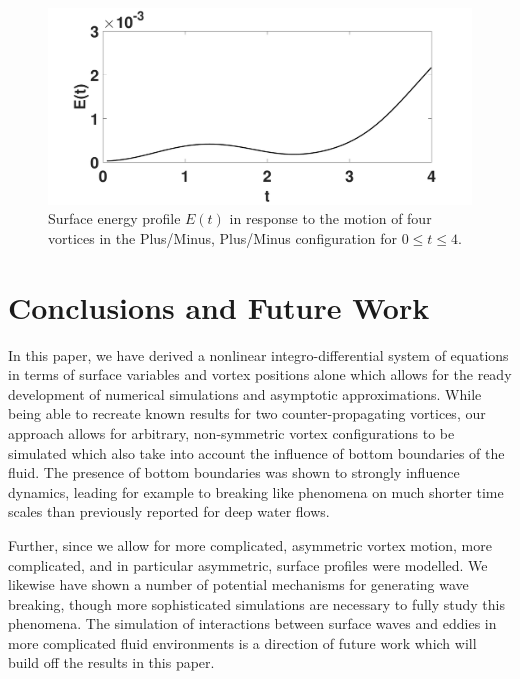 \documentclass[a4paper,11pt]{article}
\begin{document}
\begin{figure}[!h]
\centering
\includegraphics[width=.75\textwidth]{energy_profile_mu_pt2_F_pt2_pmpm}
\caption{Surface energy profile $E(t)$ in response to the motion of four vortices in the Plus/Minus, Plus/Minus configuration for $0\leq t \leq 4$.}
\label{fig:eprof_pmpm}
\end{figure}

\section{Conclusions and Future Work}
In this paper, we have derived a nonlinear integro-differential system of equations in terms of surface variables and vortex positions alone which allows for the ready development of numerical simulations and asymptotic approximations.  While being able to recreate known results for two counter-propagating vortices, our approach allows for arbitrary, non-symmetric vortex configurations to be simulated which also take into account the influence of bottom boundaries of the fluid.  The presence of bottom boundaries was shown to strongly influence dynamics, leading for example to breaking like phenomena on much shorter time scales than previously reported for deep water flows.  

Further, since we allow for more complicated, asymmetric vortex motion, more complicated, and in particular asymmetric, surface profiles were modelled.  We likewise have shown a number of potential mechanisms for generating wave breaking, though more sophisticated simulations are necessary to fully study this phenomena.  The simulation of interactions between surface waves and eddies in more complicated fluid environments is a direction of future work which will build off the results in this paper.        


\end{document}
